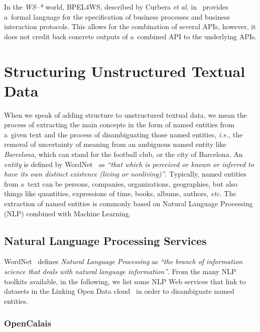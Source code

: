 In the \emph{WS--*} world, BPEL4WS, described by
Curbera \emph{et al.} in~\cite{curbera2003bpel4ws}
provides a~formal language for the specification of
business processes and business interaction protocols.
This allows for the combination of several APIs, however,
it does not credit back concrete outputs of a~combined API
to the underlying APIs.

\section{Structuring Unstructured Textual Data} 
\label{sec:structuring}

When we speak of adding structure to unstructured textual data,
we mean the process of extracting the main concepts
in the form of named entities from a~given text
and the process of disambiguating those named entities,
\emph{i.e.}, the removal of uncertainty of meaning from
an ambiguous named entity like \emph{Barcelona},
which can stand for the football club, or the city of Barcelona.
An \emph{entity} is defined by
WordNet~\cite{miller1995wordnet,fellbaum1998wordnet}
as \textit{``that which is perceived or known or inferred
to have its own distinct existence (living or nonliving)''}. 
Typically, named entities from a~text can be persons, companies,
organizations, geographies, but also things like quantities,
expressions of time, books, albums, authors, \emph{etc.}
The extraction of named entities is commonly based on
Natural Language Processing (NLP) combined with Machine Learning.

\subsection{Natural Language Processing Services}
\label{sec:nlp-services}

WordNet~\cite{miller1995wordnet,fellbaum1998wordnet}
defines \emph{Natural Language Processing} as
\textit{``the branch of information science that deals with
natural language information''}.
From the many NLP toolkits available,
in the following, we list some NLP Web services
that link to datasets in the
Linking Open Data
cloud~\cite{bizer2011statelodcloud,cyganiak2011lodcloud}
in order to disambiguate named entities.

\subsubsection{OpenCalais}\label{sec:opencalais}

